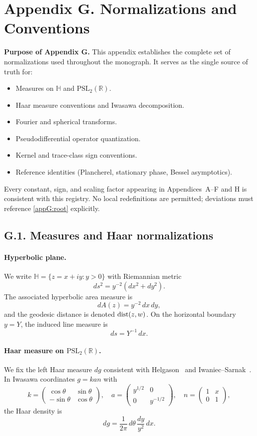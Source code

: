 \appendix
\section*{Appendix G. Normalizations and Conventions}
\label{appG:root}

\noindent\textbf{Purpose of Appendix G.}  
This appendix establishes the complete set of normalizations used throughout the monograph.  
It serves as the single source of truth for:
\begin{itemize}
    \item Measures on $\mathbb{H}$ and $\mathrm{PSL}_2(\mathbb{R})$.
    \item Haar measure conventions and Iwasawa decomposition.
    \item Fourier and spherical transforms.
    \item Pseudodifferential operator quantization.
    \item Kernel and trace-class sign conventions.
    \item Reference identities (Plancherel, stationary phase, Bessel asymptotics).
\end{itemize}
Every constant, sign, and scaling factor appearing in Appendices~A--F and H is consistent with this registry.  
No local redefinitions are permitted; deviations must reference \cref{appG:root} explicitly.  

\bigskip
\subsection*{G.1. Measures and Haar normalizations}
\label{appG:measures}

\paragraph{Hyperbolic plane.}  
We write $\mathbb{H}=\{z=x+iy:y>0\}$ with Riemannian metric
\[
ds^2 = y^{-2}(dx^2+dy^2).
\]
The associated hyperbolic area measure is
\[
dA(z) = y^{-2}\, dx\, dy,
\]
and the geodesic distance is denoted $\operatorname{dist}(z,w)$.  
On the horizontal boundary $y=Y$, the induced line measure is
\[
ds = Y^{-1}\, dx.
\]

\paragraph{Haar measure on $\mathrm{PSL}_2(\mathbb{R})$.}  
We fix the left Haar measure $dg$ consistent with Helgason~\cite[Ch.~I]{Helgason} and Iwaniec--Sarnak~\cite[§7.2]{Iwaniec2002}.  
In Iwasawa coordinates $g=kan$ with
\[
k=\begin{pmatrix}
\cos\theta & \sin\theta \\
-\sin\theta & \cos\theta
\end{pmatrix},\quad
a=\begin{pmatrix}
y^{1/2} & 0 \\
0 & y^{-1/2}
\end{pmatrix},\quad
n=\begin{pmatrix}
1 & x \\
0 & 1
\end{pmatrix},
\]
the Haar density is
\[
dg = \frac{1}{2\pi}\, d\theta \,\frac{dy}{y^2}\, dx.
\]

